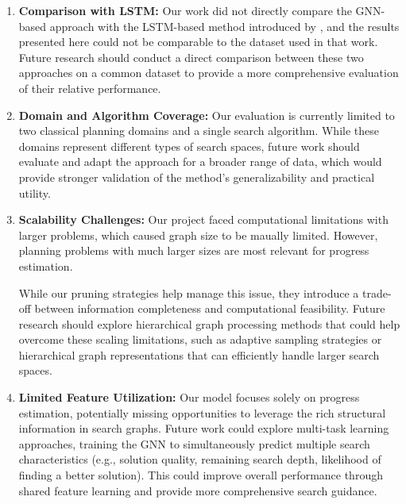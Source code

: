 \documentclass[letterpaper]{article}
\begin{document}
\begin{enumerate}
    \item \textbf{Comparison with LSTM:} Our work did not directly compare the GNN-based approach with the LSTM-based method introduced by \citet{sudry2022learning}, and the results presented here could not be comparable to the dataset used in that work. Future research should conduct a direct comparison between these two approaches on a common dataset to provide a more comprehensive evaluation of their relative performance.

    \item \textbf{Domain and Algorithm Coverage:} Our evaluation is currently limited to two classical planning domains and a single search algorithm. While these domains represent different types of search spaces, future work should evaluate and adapt the approach for a broader range of data, which would provide stronger validation of the method's generalizability and practical utility.

    \item \textbf{Scalability Challenges:} Our project faced computational limitations with larger problems, which caused graph size to be maually limited. However, planning problems with much larger sizes are most relevant for progress estimation.

    While our pruning strategies help manage this issue, they introduce a trade-off between information completeness and computational feasibility. Future research should explore hierarchical graph processing methods that could help overcome these scaling limitations, such as adaptive sampling strategies or hierarchical graph representations that can efficiently handle larger search spaces.

    \item \textbf{Limited Feature Utilization:} Our model focuses solely on progress estimation, potentially missing opportunities to leverage the rich structural information in search graphs. Future work could explore multi-task learning approaches, training the GNN to simultaneously predict multiple search characteristics (e.g., solution quality, remaining search depth, likelihood of finding a better solution). This could improve overall performance through shared feature learning and provide more comprehensive search guidance.
\end{enumerate}


\onecolumn
\end{document}
